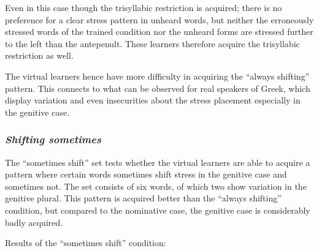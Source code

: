 \documentclass[a4paper]{article}
\begin{document}
Even in this case though the trisyllabic restriction is acquired; there is no preference for a clear stress pattern in unheard words, but neither the erroneously stressed words of the trained condition nor the unheard forms are stressed further to the left than the antepenult. These learners therefore acquire the trisyllabic restriction as well.

The virtual learners hence have more difficulty in acquiring the “always shifting” pattern. This connects to what can be observed for real speakers of Greek, which display variation and even insecurities about the stress placement especially in the genitive case.

\subsubsection{\itshape
Shifting sometimes}

The “sometimes shift” set tests whether the virtual learners are able to acquire a pattern where certain words sometimes shift stress in the genitive case and sometimes not. The set consists of six words, of which two show variation in the genitive plural. This pattern is acquired better than the “always shifting” condition, but compared to the nominative case, the genitive case is considerably badly acquired.

\ea Results of the “sometimes shift” condition:
\end{document}
